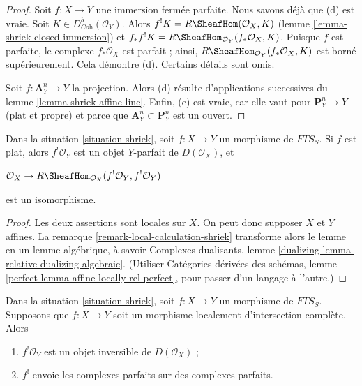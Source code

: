 \begin{proof}
\medskip\noindent
Soit $f : X \to Y$ une immersion fermée parfaite. Nous savons déjà que (d) est vraie. Soit $K \in D^b_{\textit{Coh}}(\mathcal{O}_Y)$. Alors $f^!K = R\SheafHom(\mathcal{O}_X, K)$ (lemme \ref{lemma-shriek-closed-immersion}) et $f_*f^!K = R\SheafHom_{\mathcal{O}_Y}(f_*\mathcal{O}_X, K)$. Puisque $f$ est parfaite, le complexe $f_*\mathcal{O}_X$ est parfait ; ainsi, $R\SheafHom_{\mathcal{O}_Y}(f_*\mathcal{O}_X, K)$ est borné supérieurement. Cela démontre (d). Certains détails sont omis.

\medskip\noindent
Soit $f : \mathbf{A}^n_Y \to Y$ la projection. Alors (d) résulte d'applications successives du lemme \ref{lemma-shriek-affine-line}. Enfin, (e) est vraie, car elle vaut pour $\mathbf{P}^n_Y \to Y$ (plat et propre) et parce que $\mathbf{A}^n_Y \subset \mathbf{P}^n_Y$ est un ouvert.
\end{proof}

\begin{lemma}
\label{lemma-flat-shriek-relatively-perfect}
Dans la situation \ref{situation-shriek}, soit $f : X \to Y$ un morphisme de $\textit{FTS}_S$. Si $f$ est plat, alors $f^!\mathcal{O}_Y$ est un objet $Y$-parfait de $D(\mathcal{O}_X)$, et
\par\noindent\hfil
$\mathcal{O}_X \to
R\SheafHom_{\mathcal{O}_X}(f^!\mathcal{O}_Y, f^!\mathcal{O}_Y)$
\hfil\par\noindent
est un isomorphisme.
\end{lemma}

\begin{proof}
Les deux assertions sont locales sur $X$. On peut donc supposer $X$ et $Y$ affines. La remarque \ref{remark-local-calculation-shriek} transforme alors le lemme en un lemme algébrique, à savoir Complexes dualisants, lemme \ref{dualizing-lemma-relative-dualizing-algebraic}. (Utiliser Catégories dérivées des schémas, lemme \ref{perfect-lemma-affine-locally-rel-perfect}, pour passer d'un langage à l'autre.)
\end{proof}

\begin{lemma}
\label{lemma-lci-shriek}
Dans la situation \ref{situation-shriek}, soit $f : X \to Y$ un morphisme de $\textit{FTS}_S$. Supposons que $f : X \to Y$ soit un morphisme localement d'intersection complète. Alors
\begin{enumerate}
\item $f^!\mathcal{O}_Y$ est un objet inversible de $D(\mathcal{O}_X)$ ;
\item $f^!$ envoie les complexes parfaits sur des complexes parfaits.
\end{enumerate}
\end{lemma}

